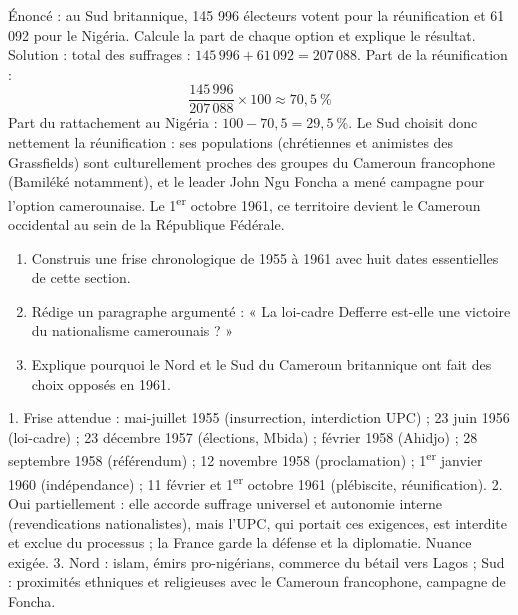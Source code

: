 \documentclass[11pt]{article}
\begin{document}
\begin{exoresolu}
Énoncé : au Sud britannique, 145 996 électeurs votent pour la réunification et 61 092 pour le Nigéria. Calcule la part de chaque option et explique le résultat.
\tcblower
Solution : total des suffrages : $145\,996 + 61\,092 = 207\,088$. Part de la réunification :
\[ \frac{145\,996}{207\,088} \times 100 \approx 70,5\ \% \]
Part du rattachement au Nigéria : $100 - 70,5 = 29,5\ \%$. Le Sud choisit donc nettement la réunification : ses populations (chrétiennes et animistes des Grassfields) sont culturellement proches des groupes du Cameroun francophone (Bamiléké notamment), et le leader John Ngu Foncha a mené campagne pour l'option camerounaise. Le 1\textsuperscript{er} octobre 1961, ce territoire devient le Cameroun occidental au sein de la République Fédérale.
\end{exoresolu}

\begin{exercice}
\begin{enumerate}
\item Construis une frise chronologique de 1955 à 1961 avec huit dates essentielles de cette section.
\item Rédige un paragraphe argumenté : « La loi-cadre Defferre est-elle une victoire du nationalisme camerounais ? »
\item Explique pourquoi le Nord et le Sud du Cameroun britannique ont fait des choix opposés en 1961.
\end{enumerate}
\end{exercice}

\begin{corrige}
1. Frise attendue : mai-juillet 1955 (insurrection, interdiction UPC) ; 23 juin 1956 (loi-cadre) ; 23 décembre 1957 (élections, Mbida) ; février 1958 (Ahidjo) ; 28 septembre 1958 (référendum) ; 12 novembre 1958 (proclamation) ; 1\textsuperscript{er} janvier 1960 (indépendance) ; 11 février et 1\textsuperscript{er} octobre 1961 (plébiscite, réunification).
2. Oui partiellement : elle accorde suffrage universel et autonomie interne (revendications nationalistes), mais l'UPC, qui portait ces exigences, est interdite et exclue du processus ; la France garde la défense et la diplomatie. Nuance exigée.
3. Nord : islam, émirs pro-nigérians, commerce du bétail vers Lagos ; Sud : proximités ethniques et religieuses avec le Cameroun francophone, campagne de Foncha.
\end{corrige}
\end{document}
